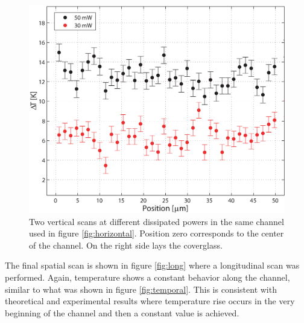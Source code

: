 \documentclass[twocolumn]{svjour3}       %
\begin{document}
\begin{figure}[h!]
\centering
\includegraphics[width=\columnwidth]{figs/fig6.eps}
\caption{Two vertical scans at different dissipated powers in the same channel used in figure \ref{fig:horizontal}. Position zero corresponds to the center of the channel. On the right side lays the coverglass.\label{fig:vertical}}
\end{figure}

The final spatial scan is shown in figure \ref{fig:long} where a longitudinal scan was performed. Again, temperature shows a constant behavior along the channel, similar to what was shown in figure \ref{fig:temporal}. This is consistent with theoretical and experimental results \cite{jouleteorico,xuan2008} where temperature rise occurs in the very beginning of the channel and then a constant value is achieved. 

%
\end{document}
